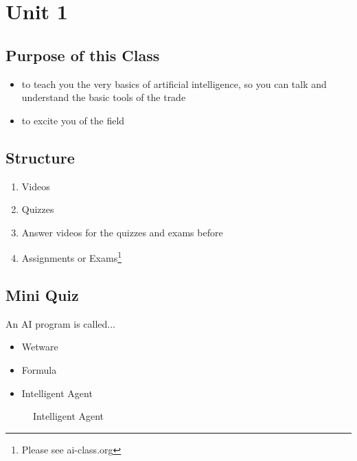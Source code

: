 \section{Unit 1}

\subsection{Purpose of this Class}
  \begin{itemize}
    \item to teach you the very basics of artificial intelligence, so you can talk and understand
    the basic tools of the trade
    \item to excite you of the field
  \end{itemize}

\subsection{Structure}
  \begin{enumerate}
    \item Videos
    \item Quizzes
    \item Answer videos for the quizzes and exams before
    \item Assignments or Exams\footnote{Please see ai-class.org}
  \end{enumerate}

\subsection{Mini Quiz}
  An AI program is called...\\

  \begin{itemize}
    \item Wetware
    \item Formula
    \item Intelligent Agent
  \end{itemize}


  \begin{figure}[!h]
      \centering
      \fbox{
      }
      \caption{Intelligent Agent}
      \label{fig:Intelligent_Agent}
  \end{figure}



